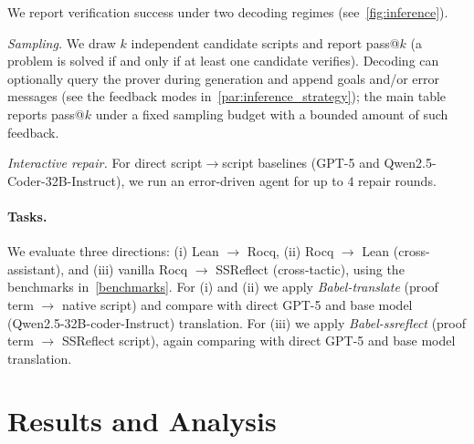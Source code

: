 \documentclass{article}
\theoremstyle{plain}
\theoremstyle{definition}
\theoremstyle{remark}
\begin{document}
	We report verification success under two decoding regimes (see~\cref{fig:inference}).
	
	\emph{Sampling.} We draw $k$ independent candidate scripts and report pass@$k$ (a problem is solved if and only if at least one candidate verifies).
	Decoding can optionally query the prover during generation and append goals and/or error messages (see the feedback modes in~\cref{par:inference_strategy}); the main table reports pass@$k$ under a fixed sampling budget with a bounded amount of such feedback.
	
	\emph{Interactive repair.} For direct script$\to$script baselines (GPT-5 and Qwen2.5-Coder-32B-Instruct), we run an error-driven agent for up to $4$ repair rounds.
	
	\paragraph{Tasks.}
	We evaluate three directions:
	(i) Lean $\to$ Rocq,
	(ii) Rocq $\to$ Lean (cross-assistant), and
	(iii) vanilla Rocq $\to$ SSReflect (cross-tactic), using the benchmarks in~\cref{benchmarks}.
	For (i) and (ii) we apply \textit{Babel-translate} (proof term $\to$ native script) and compare with direct GPT-5 and base model (Qwen2.5-32B-coder-Instruct) translation. For (iii) we apply \textit{Babel-ssreflect} (proof term $\to$ SSReflect script), again comparing with direct GPT-5 and base model translation.
	
	\section{Results and Analysis}
	
\end{document}
